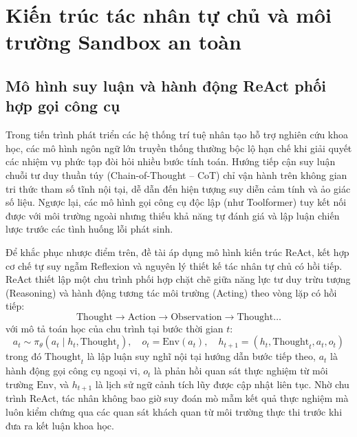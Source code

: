 \section{Kiến trúc tác nhân tự chủ và môi trường Sandbox an toàn}
\label{sec:agentic_react_sandbox}

\subsection{Mô hình suy luận và hành động ReAct phối hợp gọi công cụ}
\label{subsec:react_framework}
Trong tiến trình phát triển các hệ thống trí tuệ nhân tạo hỗ trợ nghiên cứu khoa học, các mô hình ngôn ngữ lớn truyền thống thường bộc lộ hạn chế khi giải quyết các nhiệm vụ phức tạp đòi hỏi nhiều bước tính toán. Hướng tiếp cận suy luận chuỗi tư duy thuần túy (Chain-of-Thought -- CoT) chỉ vận hành trên không gian tri thức tham số tĩnh nội tại, dễ dẫn đến hiện tượng suy diễn cảm tính và ảo giác số liệu. Ngược lại, các mô hình gọi công cụ độc lập (như Toolformer) tuy kết nối được với môi trường ngoài nhưng thiếu khả năng tự đánh giá và lập luận chiến lược trước các tình huống lỗi phát sinh.

Để khắc phục nhược điểm trên, đề tài áp dụng mô hình kiến trúc ReAct, kết hợp cơ chế tự suy ngẫm Reflexion và nguyên lý thiết kế tác nhân tự chủ có hồi tiếp. ReAct thiết lập một chu trình phối hợp chặt chẽ giữa năng lực tư duy trừu tượng (Reasoning) và hành động tương tác môi trường (Acting) theo vòng lặp có hồi tiếp:
\vspace{-6pt}
\begin{equation}
\label{eq:react_cycle}
\text{Thought} \longrightarrow \text{Action} \longrightarrow \text{Observation} \longrightarrow \text{Thought} \dots
\end{equation}
\vspace{-6pt}
với mô tả toán học của chu trình tại bước thời gian $t$:
\vspace{-6pt}
\begin{equation}
\label{eq:react_math}
a_t \sim \pi_{\theta}(a_t \mid h_t, \text{Thought}_t), \quad o_t = \text{Env}(a_t), \quad h_{t+1} = (h_t, \text{Thought}_t, a_t, o_t)
\end{equation}
\vspace{-6pt}
trong đó $\text{Thought}_t$ là lập luận suy nghĩ nội tại hướng dẫn bước tiếp theo, $a_t$ là hành động gọi công cụ ngoại vi, $o_t$ là phản hồi quan sát thực nghiệm từ môi trường $\text{Env}$, và $h_{t+1}$ là lịch sử ngữ cảnh tích lũy được cập nhật liên tục. Nhờ chu trình ReAct, tác nhân không bao giờ suy đoán mò mẫm kết quả thực nghiệm mà luôn kiểm chứng qua các quan sát khách quan từ môi trường thực thi trước khi đưa ra kết luận khoa học.

